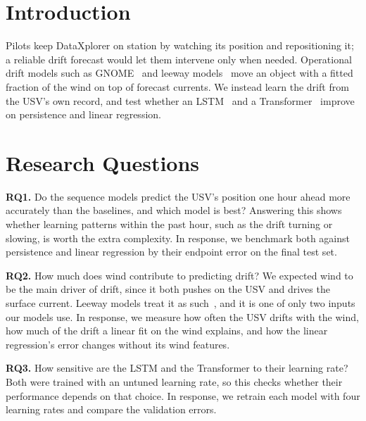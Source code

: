 \documentclass[sigconf]{acmart}
\begin{document}
\section{Introduction}
Pilots keep DataXplorer on station by watching its position and repositioning it; a reliable drift forecast would let them intervene only when needed. Operational drift models such as GNOME~\cite{zelenke2012gnome} and leeway models~\cite{breivik2011leeway} move an object with a fitted fraction of the wind on top of forecast currents. We instead learn the drift from the USV's own record, and test whether an LSTM~\cite{hochreiter1997lstm} and a Transformer~\cite{vaswani2017attention} improve on persistence and linear regression.


\section{Research Questions}
\noindent\textbf{RQ1.} Do the sequence models predict the USV's position one hour ahead more accurately than the baselines, and which model is best? Answering this shows whether learning patterns within the past hour, such as the drift turning or slowing, is worth the extra complexity. In response, we benchmark both against persistence and linear regression by their endpoint error on the final test set.


\noindent\textbf{RQ2.} How much does wind contribute to predicting drift? We expected wind to be the main driver of drift, since it both pushes on the USV and drives the surface current.
Leeway models treat it as such~\cite{breivik2011leeway}, and it is one of only two inputs our models use. In response, we measure how often the USV drifts with the wind, how much of the drift a linear fit on the wind explains, and how the linear regression's error changes without its wind features.




\noindent\textbf{RQ3.} How sensitive are the LSTM and the Transformer to their learning rate? Both were trained with an untuned learning rate, so this checks whether their performance depends on that choice. In response, we retrain each model with four learning rates and compare the validation errors.
\end{document}
